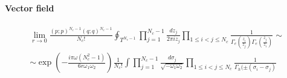 \begin{appendices}
\begin{comment}
\paragraph{Vector field}
\begin{multline}
 \prod_{1 \leq i <j \leq N_c} 
  \Gamma_e\left(  {z_i \over z_j} \right)\Gamma_e\left(  {z_j \over z_i} \right) 
  \sim  \\
 \sim  \prod_{1 \leq i <j \leq N_c} 
 \exp{\left( - \frac{i \pi} {6 r \omega_1 \omega_2 }  ( (\sigma_j - \sigma_i) + (\sigma_i- \sigma_j) - 2 \omega) \right) } \, \, \Gamma_h (  \sigma_i - \sigma_j) \Gamma_h (  \sigma_j - \sigma_i) =\\
= \exp \bigg( {- \frac{i \pi} {6 r \omega_1 \omega_2 }  ( - N_c(N_c -1) \, \omega)}  \bigg)   \prod_{1 \leq i <j \leq N_c} 
 \, \Gamma_h ( \pm ( \sigma_i - \sigma_j)) 
\end{multline}

\end{comment}
\paragraph{Vector field}
\begin{multline}
\lim_{r \rightarrow 0} \frac{ (p;p)^{N_c- 1}(q;q)^{N_c- 1} }{ N_c ! }
\oint_{T^{N_c -1}} \prod_{j=1}^{N_c -1 } \frac{ d z_j}{2 \pi i z_j} \prod_{1 \leq i<j \leq N_c } \frac{1}{\Gamma_e( \frac{z_i}{z_j} )\Gamma_e( \frac{z_j}{z_i} )} \sim
\\
\sim 
\exp \left(  
- \frac{ i \pi \omega (N_c^2 -1)}{6 r \omega_1 \omega_2}
\right)
 \frac{1}{N_c !} \int \prod_{j=1}^{N_c -1 } \frac{d \sigma_j}{\sqrt{- \omega_1 \omega_2} } \prod_{1 \leq i<j \leq N_c }\frac{1}{\Gamma_h( \pm (\sigma_i - \sigma_j) }
\end{multline}





\end{appendices}
